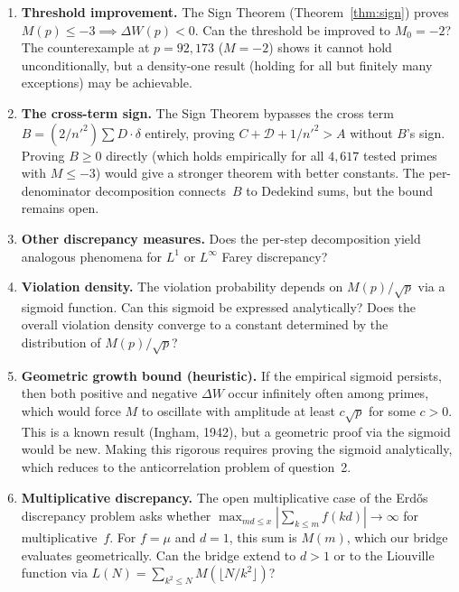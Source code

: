 \documentclass[11pt]{article}
\theoremstyle{definition}
\begin{document}
\begin{enumerate}
  \item \textbf{Threshold improvement.}
    The Sign Theorem (Theorem~\ref{thm:sign}) proves
    $M(p) \le -3 \implies \Delta W(p) < 0$.
    Can the threshold be improved to $M_0 = -2$?
    The counterexample at $p = 92{,}173$ ($M = -2$) shows it
    cannot hold unconditionally, but a density-one result
    (holding for all but finitely many exceptions) may be achievable.

  \item \textbf{The cross-term sign.}
    The Sign Theorem bypasses the cross term $B = (2/n'^2)\sum D
    \cdot \delta$ entirely, proving $C + \mathcal{D} + 1/{n'}^2 > A$ without
    $B$'s sign.  Proving $B \ge 0$ directly (which holds
    empirically for all $4{,}617$ tested primes with $M \le -3$)
    would give a stronger theorem with better constants.
    The per-denominator decomposition connects~$B$ to Dedekind
    sums, but the bound remains open.

  \item \textbf{Other discrepancy measures.}  Does the per-step
    decomposition yield analogous phenomena for $L^1$ or $L^\infty$
    Farey discrepancy?

  \item \textbf{Violation density.}  The violation probability
    depends on $M(p)/\sqrt{p}$ via a sigmoid function.  Can this
    sigmoid be expressed analytically?  Does the overall violation
    density converge to a constant determined by the distribution
    of $M(p)/\sqrt{p}$?

  \item \textbf{Geometric growth bound (heuristic).}  If the
    empirical sigmoid persists, then both positive and negative
    $\Delta W$ occur infinitely often among primes, which would
    force $M$ to oscillate with amplitude at least
    $c\sqrt{p}$ for some $c > 0$.  This is a known result
    (Ingham, 1942), but a geometric proof via the sigmoid would
    be new.  Making this rigorous requires proving the
    sigmoid analytically, which reduces to the anticorrelation
    problem of question~2.

  \item \textbf{Multiplicative discrepancy.}  The open
    multiplicative case of the Erd\H{o}s discrepancy problem
    asks whether $\max_{md \le x}|\sum_{k \le m}f(kd)|
    \to \infty$ for multiplicative~$f$.  For $f = \mu$ and
    $d = 1$, this sum is $M(m)$, which our bridge evaluates
    geometrically.  Can the bridge extend to $d > 1$ or to
    the Liouville function via
    $L(N) = \sum_{k^2 \le N} M(\lfloor N/k^2 \rfloor)$?


\end{enumerate}
\end{document}
